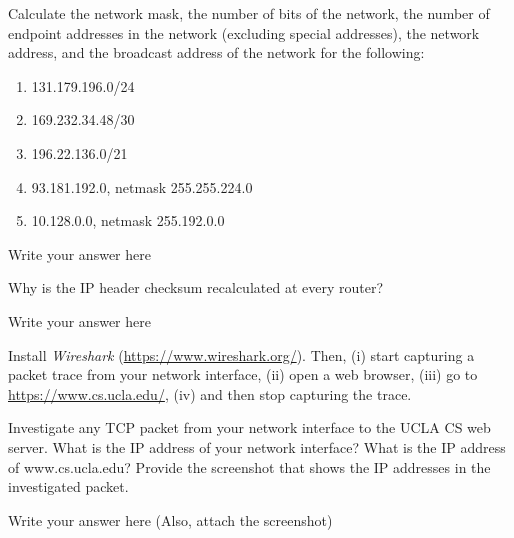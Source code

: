 \documentclass{report}
\begin{document}
\newpage



\begin{problem}
Calculate the network mask, the number of bits of the network, the number of endpoint addresses in the network (excluding special addresses), the network address, and the broadcast address of the network for the following:

\begin{enumerate}
\item 131.179.196.0/24
\item 169.232.34.48/30
\item 196.22.136.0/21
\item 93.181.192.0, netmask 255.255.224.0
\item 10.128.0.0, netmask 255.192.0.0
\end{enumerate}



\begin{answer}{35em}
  Write your answer here
\end{answer}

\end{problem}

\newpage



\begin{problem}
Why is the IP header checksum recalculated at every router?

\begin{answer}{40em}
    Write your answer here
\end{answer}

\end{problem}

\newpage



\begin{problem}
Install \textit{Wireshark} (\url{https://www.wireshark.org/}). Then, (i) start capturing a packet trace from your network interface, (ii) open a web browser, (iii) go to \url{https://www.cs.ucla.edu/}, (iv) and then stop capturing the trace.

Investigate any TCP packet from your network interface to the UCLA CS web server.
What is the IP address of your network interface? What is the IP address of www.cs.ucla.edu? Provide the screenshot that shows the IP addresses in the investigated packet.

\begin{answer}{40em}
    Write your answer here (Also, attach the screenshot)
\end{answer}

\end{problem}
\end{document}
